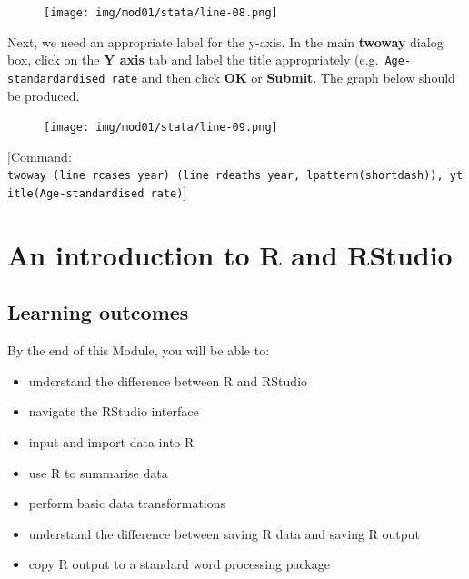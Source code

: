 \documentclass[
  a4paper,
]{memoir}
\providecommand{\tightlist}{%
  \setlength{\itemsep}{0pt}\setlength{\parskip}{0pt}}\usepackage{longtable,booktabs,array}
\begin{document}
\begin{figure}[H]

{\centering \texttt{[image: img/mod01/stata/line-08.png]}

}

\end{figure}

Next, we need an appropriate label for the y-axis. In the main
\textbf{twoway} dialog box, click on the \textbf{Y axis} tab and label
the title appropriately (e.g.~\texttt{Age-standardardised\ rate} and
then click \textbf{OK} or \textbf{Submit}. The graph below should be
produced.

\begin{figure}[H]

{\centering \texttt{[image: img/mod01/stata/line-09.png]}

}

\end{figure}

{[}Command:
\texttt{twoway\ (line\ rcases\ year)\ (line\ rdeaths\ year,\ lpattern(shortdash)),\ ytitle(Age-standardised\ rate)}{]}

\newpage{}


\hypertarget{an-introduction-to-r-and-rstudio}{%
\chapter*{An introduction to R and
RStudio}\label{an-introduction-to-r-and-rstudio}}


\hypertarget{learning-outcomes-2}{%
\section*{Learning outcomes}\label{learning-outcomes-2}}


By the end of this Module, you will be able to:

\begin{itemize}
\tightlist
\item
  understand the difference between R and RStudio
\item
  navigate the RStudio interface
\item
  input and import data into R
\item
  use R to summarise data
\item
  perform basic data transformations
\item
  understand the difference between saving R data and saving R output
\item
  copy R output to a standard word processing package
\end{itemize}
\end{document}

